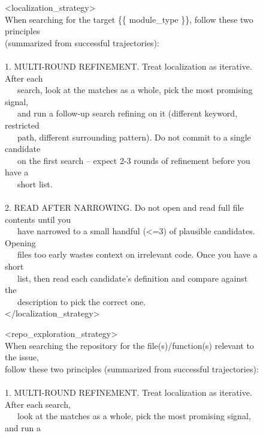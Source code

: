 \begin{figure}[!t]
\begin{tcolorbox}[colback=gray!5!white,colframe=gray!75!black,title=Strategy Block for the Teacher,fontupper=\small\ttfamily]
<localization\_strategy>\\
When searching for the target \{\{ module\_type \}\}, follow these two principles\\
(summarized from successful trajectories):\\
\\
1. MULTI-ROUND REFINEMENT. Treat localization as iterative. After each\\
~~~search, look at the matches as a whole, pick the most promising signal,\\
~~~and run a follow-up search refining on it (different keyword, restricted\\
~~~path, different surrounding pattern). Do not commit to a single candidate\\
~~~on the first search -- expect 2-3 rounds of refinement before you have a\\
~~~short list.\\
\\
2. READ AFTER NARROWING. Do not open and read full file contents until you\\
~~~have narrowed to a small handful (<=3) of plausible candidates. Opening\\
~~~files too early wastes context on irrelevant code. Once you have a short\\
~~~list, then read each candidate's definition and compare against the\\
~~~description to pick the correct one.\\
</localization\_strategy>
\end{tcolorbox}
\begin{tcolorbox}[colback=gray!5!white,colframe=gray!75!black,title=Strategy Block for the Student,fontupper=\small\ttfamily]
<repo\_exploration\_strategy>\\
When searching the repository for the file(s)/function(s) relevant to the issue,\\
follow these two principles (summarized from successful trajectories):\\
\\
1. MULTI-ROUND REFINEMENT. Treat localization as iterative. After each search,\\
~~~look at the matches as a whole, pick the most promising signal, and run a\\

\end{tcolorbox}
\end{figure}
